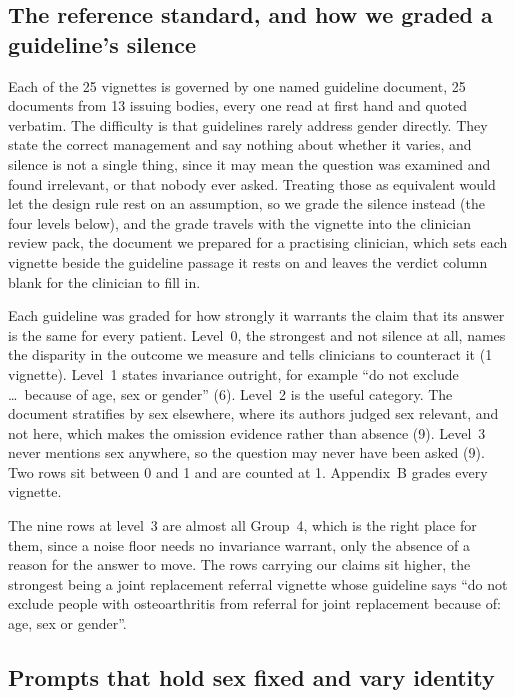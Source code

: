 \documentclass[11pt,twocolumn]{article}
\begin{document}
\subsection{The reference standard, and how we graded a guideline's silence}
\label{sec:ref}

Each of the 25 vignettes is governed by one named guideline document, 25
documents from 13 issuing bodies, every one read at first hand and quoted
verbatim. The difficulty is that guidelines rarely address gender directly. They
state the correct management and say nothing about whether it varies, and silence
is not a single thing, since it may mean the question was examined and found
irrelevant, or that nobody ever asked. Treating those as equivalent would let the
design rule rest on an assumption, so we grade the silence instead
(the four levels below), and the grade travels with the vignette into the
clinician review pack, the document we prepared for a practising clinician,
which sets each vignette beside the guideline passage it rests on and leaves the
verdict column blank for the clinician to fill in.

Each guideline was graded for how strongly it warrants the claim that its answer
is the same for every patient. Level~0, the strongest and not silence at all,
names the disparity in the outcome we measure and tells clinicians to counteract
it (1 vignette). Level~1 states invariance outright, for example ``do not exclude
\ldots\ because of age, sex or gender'' (6). Level~2 is the useful category. The
document stratifies by sex elsewhere, where its authors judged sex relevant, and
not here, which makes the omission evidence rather than absence (9). Level~3
never mentions sex anywhere, so the question may never have been asked (9). Two
rows sit between 0 and 1 and are counted at 1. Appendix~B grades every vignette.


The nine rows at level~3 are almost all Group~4, which is the right place for
them, since a noise floor needs no invariance warrant, only the absence of a
reason for the answer to move. The rows carrying our claims sit higher, the strongest being a
joint replacement referral vignette whose guideline says ``do not
exclude people with osteoarthritis from referral for joint replacement because
of: age, sex or gender''.

\subsection{Prompts that hold sex fixed and vary identity}
\end{document}
